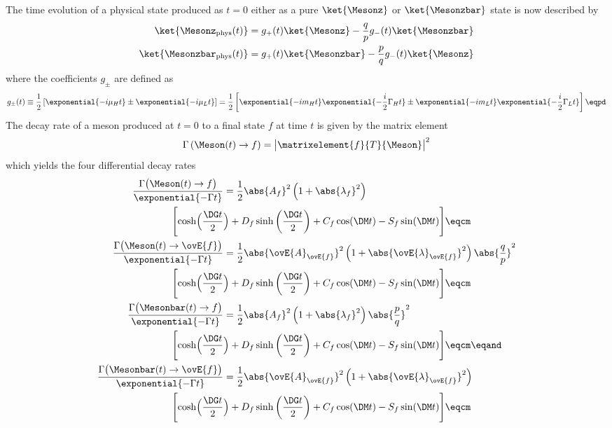The time evolution of a physical state produced as $t=0$ either as a pure
$\ket{\Mesonz}$ or $\ket{\Mesonzbar}$ state is now described by
%
\begin{equation}
  \begin{split}
    \ket{\Mesonz_{\text{phys}} (t)}    &= g_{+}(t) \ket{\Mesonz}    - \frac{q}{p} g_{-}(t) \ket{\Mesonzbar} \\
    \ket{\Mesonzbar_{\text{phys}} (t)} &= g_{+}(t) \ket{\Mesonzbar} - \frac{p}{q} g_{-}(t) \ket{\Mesonz}
  \end{split}
\end{equation}
%
where the coefficients $g_{\pm}$ are defined as
%
\begin{equation}
  g_{\pm}(t) \equiv 
  \frac{1}{2} \left[
    \exponential{-i \mu_H t} \pm \exponential{-i \mu_L t}
  \right]
  =
  \frac{1}{2} \left[
    \exponential{-i m_H t} \exponential{-\frac{i}{2} \Gamma_H t} \pm \exponential{-i m_L t} \exponential{-\frac{i}{2} \Gamma_L t}
  \right]\eqpd
\end{equation}
%
The decay rate of a meson produced at $t=0$ to a final state $f$ at time $t$
is given by the matrix element
%
\begin{equation}
  \Gamma \left(\Meson(t)\to f\right)= \bigl\vert \matrixelement{f}{T}{\Meson} \bigr\vert^2
\end{equation}
%
which yields the four differential decay rates  
%
\begin{equation}\label{eq:cpv_theory:flavour_physics:time_evolution:differential_decay_rates}
  \begin{split}
    \frac{\Gamma \bigl(\Meson   (t) \to       f \bigr)}{\exponential{-\Gamma t}} &= 
      \frac{1}{2} \abs{A_f}^2 \left( 1 + \abs{\lambda_f}^2 \right) \\
        \Biggl[ \cosh\Bigl(\frac{\DG t}{2}&\Bigr) + D_f \sinh\left(\frac{\DG t}{2}\right) + C_f \cos(\DM t) - S_f \sin(\DM t) \Biggr]\eqcm \\
    \frac{\Gamma \bigl(\Meson   (t) \to \ovE{f} \bigr)}{\exponential{-\Gamma t}} &= 
      \frac{1}{2} \abs{\ovE{A}_{\ovE{f}}}^2 \left( 1 + \abs{\ovE{\lambda}_{\ovE{f}}}^2 \right) \abs{\frac{q}{p}}^2 \\
        \Biggl[ \cosh\Bigl(\frac{\DG t}{2}&\Bigr) + D_f \sinh\left(\frac{\DG t}{2}\right) + C_f \cos(\DM t) - S_f \sin(\DM t) \Biggr]\eqcm \\
    \frac{\Gamma \bigl(\Mesonbar(t) \to       f \bigr)}{\exponential{-\Gamma t}} &= 
      \frac{1}{2} \abs{A_f}^2 \left( 1 + \abs{\lambda_f}^2 \right) \abs{\frac{p}{q}}^2 \\
        \Biggl[ \cosh\Bigl(\frac{\DG t}{2}&\Bigr) + D_f \sinh\left(\frac{\DG t}{2}\right) + C_f \cos(\DM t) - S_f \sin(\DM t) \Biggr]\eqcm\eqand \\
    \frac{\Gamma \bigl(\Mesonbar(t) \to \ovE{f} \bigr)}{\exponential{-\Gamma t}} &= 
      \frac{1}{2} \abs{\ovE{A}_{\ovE{f}}}^2 \left( 1 + \abs{\ovE{\lambda}_{\ovE{f}}}^2 \right) \\
        \Biggl[ \cosh\Bigl(\frac{\DG t}{2}&\Bigr) + D_f \sinh\left(\frac{\DG t}{2}\right) + C_f \cos(\DM t) - S_f \sin(\DM t) \Biggr]\eqcm \\
  \end{split}
\end{equation}
